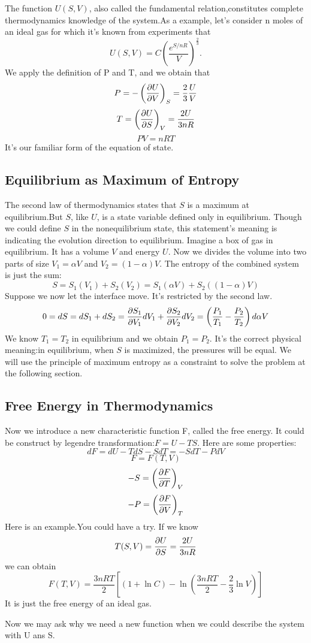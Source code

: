 \documentclass[10pt]{article}
\begin{document}
	The function $U(S,V)$, also called the fundamental relation,constitutes complete thermodynamics knowledge of the system.As a example, let's consider n moles of an ideal gas for which it's known from experiments that $$U(S,V)=C\left(\frac{e^{S/nR}}{V}\right)^{\frac{2}{3}}.$$ We apply the definition of P and T, and we obtain that
	$$P=-\left(\pdv{U}{V}\right)_S=\frac{2}{3}\frac{U}{V}$$ $$T=\left(\pdv{U}{S}\right)_V=\frac{2U}{3nR}$$ $$PV=nRT$$ It's our familiar form of the equation of state.
	\subsection{Equilibrium as Maximum of Entropy}\label{Equilibrium as Maximum of Entropy}
	The second law of thermodynamics states that $S$ is a maximum at equilibrium.But $S$, like $U$, is a state variable defined only in equilibrium. Though we could define $S$ in the nonequilibrium state, this statement's meaning is indicating the evolution direction to equilibrium. Imagine a box of gas in equilibrium. It has a volume $V$ and energy $U$. Now we divides the volume into two parts of size $V_1=\alpha V$ and $V_2=(1-\alpha)V$. The entropy of the combined system is just the sum:$$S=S_1(V_1)+S_2(V_2)=S_1(\alpha V)+S_2((1-\alpha)V)$$ 
	Suppose we now let the interface move. It's restricted by the second law.$$0=dS=dS_1+d S_2=\pdv{S_1}{V_1}dV_1+\pdv{S_2}{V_2}dV_2=\left(\frac{P_1}{T_1}-\frac{P_2}{T_2}\right)d\alpha V$$
	We know $T_1=T_2$ in equilibrium and we obtain $P_1=P_2$. It's the correct physical meaning:in equilibrium, when $S$ is maximized, the pressures will be equal. We will use the principle of maximum entropy as a constraint to solve the problem at the following section.
	
	\subsection{Free Energy in Thermodynamics}\label{Free Energy in Thermodynamics}
	Now we introduce a new characteristic function F, called the free energy. It could be construct by legendre transformation:$F=U-TS$. Here are some properties:
	$$dF=dU-TdS-SdT=-SdT-PdV$$ $$F=F(T,V)$$ $$-S=\left(\pdv{F}{T}\right)_V$$ $$-P=\left(\pdv{F}{V}\right)_T$$
	Here is an example.You could have a try. If we know $$T(S,V)=\pdv{U}{S}=\frac{2U}{3nR}$$ we can obtain $$F(T,V)=\frac{3nRT}{2}\left[\left(1+\ln C\right)-\ln\left(\frac{3nRT}{2}-\frac{2}{3}\ln V\right)\right]$$
	It is just the free energy of an ideal gas.
	
	Now we may ask why we need a new function when we could describe the system with U ans S. 
\end{document}
